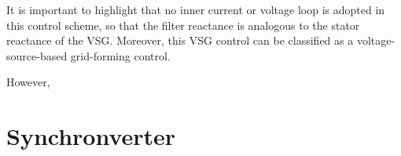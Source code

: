 It is important to highlight that no inner current or voltage loop is adopted in
this control scheme, so that the filter reactance is analogous to the stator
reactance of the VSG. Moreover, this VSG control can be classified as a
voltage-source-based grid-forming control.

However, 

\section{Synchronverter}


